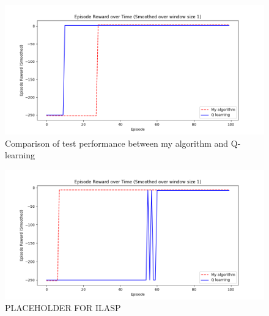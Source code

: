 \begin{figure}[!htb]
\centering
\includegraphics[width=1.0\textwidth]{./figures/experiment3_test}
\caption{Comparison of test performance between my algorithm and Q-learning}
\label{experiment3_test}
\end{figure}

\begin{figure}[!htb]
\centering
\includegraphics[width=1.0\textwidth]{./figures/experiment1_test}
\caption{PLACEHOLDER FOR ILASP}
\label{experiment1_test}
\end{figure}
    
